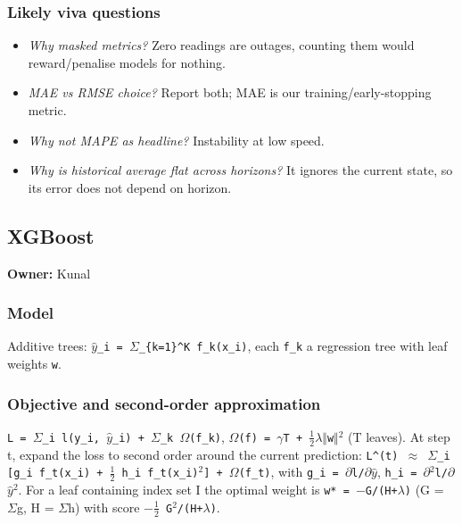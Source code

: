 \documentclass[10pt,a4paper]{article}
\begin{document}
\subsubsection*{Likely viva questions}
\begin{itemize}[nosep,leftmargin=*]
\item \emph{Why masked metrics?} Zero readings are outages, counting them would reward/\allowbreak{}penalise models for nothing.
\item \emph{MAE vs RMSE choice?} Report both; MAE is our training/\allowbreak{}early-stopping metric.
\item \emph{Why not MAPE as headline?} Instability at low speed.
\item \emph{Why is historical average flat across horizons?} It ignores the current state, so its error does not depend on horizon.
\end{itemize}

\subsection*{XGBoost}
\textbf{Owner:} Kunal

\subsubsection*{Model}
Additive trees: \texttt{\ensuremath{\hat{y}}\_\allowbreak{}i = \ensuremath{\Sigma}\_\allowbreak{}\{k=1\}\^{}K f\_\allowbreak{}k(x\_\allowbreak{}i)}, each \texttt{f\_\allowbreak{}k} a regression tree with leaf weights \texttt{w}.

\subsubsection*{Objective and second-order approximation}
\texttt{L = \ensuremath{\Sigma}\_\allowbreak{}i l(y\_\allowbreak{}i, \ensuremath{\hat{y}}\_\allowbreak{}i) + \ensuremath{\Sigma}\_\allowbreak{}k \ensuremath{\Omega}(f\_\allowbreak{}k)}, \texttt{\ensuremath{\Omega}(f) = \ensuremath{\gamma}T + \ensuremath{\tfrac{1}{2}}\ensuremath{\lambda}\ensuremath{\Vert}w\ensuremath{\Vert}\ensuremath{^{2}}} (T leaves). At step t, expand the loss to second order around the current prediction: \texttt{L\^{}(t) \ensuremath{\approx} \ensuremath{\Sigma}\_\allowbreak{}i [g\_\allowbreak{}i f\_\allowbreak{}t(x\_\allowbreak{}i) + \ensuremath{\tfrac{1}{2}} h\_\allowbreak{}i f\_\allowbreak{}t(x\_\allowbreak{}i)\ensuremath{^{2}}] + \ensuremath{\Omega}(f\_\allowbreak{}t)}, with \texttt{g\_\allowbreak{}i = \ensuremath{\partial}l/\allowbreak{}\ensuremath{\partial}\ensuremath{\hat{y}}}, \texttt{h\_\allowbreak{}i = \ensuremath{\partial}\ensuremath{^{2}}l/\allowbreak{}\ensuremath{\partial}\ensuremath{\hat{y}}\ensuremath{^{2}}}. For a leaf containing index set I the optimal weight is \texttt{w* = \ensuremath{-}G/\allowbreak{}(H+\ensuremath{\lambda})} (G = \ensuremath{\Sigma}g, H = \ensuremath{\Sigma}h) with score \texttt{\ensuremath{-}\ensuremath{\tfrac{1}{2}} G\ensuremath{^{2}}/\allowbreak{}(H+\ensuremath{\lambda})}.
\end{document}
